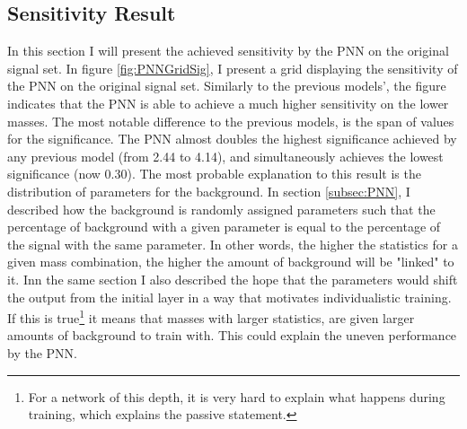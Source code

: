 \subsection{Sensitivity Result}
In this section I will present the achieved sensitivity by the \ac{PNN} on the original signal set. In figure \ref{fig:PNNGridSig}, I present a grid displaying the sensitivity 
of the \ac{PNN} on the original signal set. Similarly to the previous models', the figure indicates that the \ac{PNN} is able to achieve a much higher sensitivity on the lower
masses. The most notable difference to the previous models, is the span of values for the significance. The \ac{PNN} almost doubles the highest significance achieved by any previous model
(from 2.44 to 4.14), and simultaneously achieves the lowest significance (now 0.30). The most probable explanation to this result is the distribution of parameters for the background. 
In section \ref{subsec:PNN}, I described how the background is randomly assigned parameters such that the percentage of background with a given parameter is equal to the percentage 
of the signal with the same parameter. In other words, the higher the statistics for a given mass combination, the higher the amount of background will be "linked" to it. Inn the 
same section I also described the hope that the parameters would shift the output from the initial layer in a way that motivates individualistic training. If this is 
true\footnote{For a network of this depth, it is very hard to explain what happens during training, which explains the passive statement.} it means that masses with larger statistics, 
are given larger amounts of background to train with. This could explain the uneven performance by the \ac{PNN}. \\
